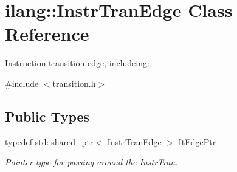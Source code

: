 \hypertarget{classilang_1_1_instr_tran_edge}{}\section{ilang\+:\+:Instr\+Tran\+Edge Class Reference}
\label{classilang_1_1_instr_tran_edge}


Instruction transition edge, includeing\+:  




{\ttfamily \#include $<$transition.\+h$>$}

\subsection*{Public Types}
\begin{DoxyCompactItemize}
\item 
\mbox{\label{classilang_1_1_instr_tran_edge_ada0821479c930f2895d2614405d3971f}} 
typedef std\+::shared\+\_\+ptr$<$ \mbox{\hyperlink{classilang_1_1_instr_tran_edge}{Instr\+Tran\+Edge}} $>$ \mbox{\hyperlink{classilang_1_1_instr_tran_edge_ada0821479c930f2895d2614405d3971f}{It\+Edge\+Ptr}}
\begin{DoxyCompactList}\small\item\em Pointer type for passing around the Instr\+Tran. \end{DoxyCompactList}\end{DoxyCompactItemize}
